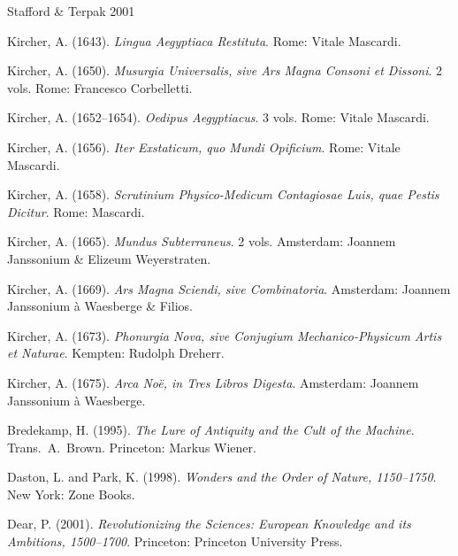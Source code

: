 \documentclass[12pt, a4paper, twoside]{memoir}
\theoremstyle{definition}
\theoremstyle{remark}
\begin{document}
\begin{thebibliography}{Stafford \& Terpak 2001}

Kircher, A. (1643). \textit{Lingua Aegyptiaca Restituta}. Rome: Vitale Mascardi.

Kircher, A. (1650). \textit{Musurgia Universalis, sive Ars Magna Consoni et Dissoni}. 2 vols. Rome: Francesco Corbelletti.

Kircher, A. (1652--1654). \textit{Oedipus Aegyptiacus}. 3 vols. Rome: Vitale Mascardi.

Kircher, A. (1656). \textit{Iter Exstaticum, quo Mundi Opificium}. Rome: Vitale Mascardi.

Kircher, A. (1658). \textit{Scrutinium Physico-Medicum Contagiosae Luis, quae Pestis Dicitur}. Rome: Mascardi.

Kircher, A. (1665). \textit{Mundus Subterraneus}. 2 vols. Amsterdam: Joannem Janssonium \& Elizeum Weyerstraten.

Kircher, A. (1669). \textit{Ars Magna Sciendi, sive Combinatoria}. Amsterdam: Joannem Janssonium \`{a} Waesberge \& Filios.

Kircher, A. (1673). \textit{Phonurgia Nova, sive Conjugium Mechanico-Physicum Artis et Naturae}. Kempten: Rudolph Dreherr.

Kircher, A. (1675). \textit{Arca No\"{e}, in Tres Libros Digesta}. Amsterdam: Joannem Janssonium \`{a} Waesberge.

\bigskip
{}\smallskip

\noindent{\color{arkgold}\rule{\linewidth}{0.4pt}}\medskip

Bredekamp, H. (1995). \textit{The Lure of Antiquity and the Cult of the Machine}. Trans.\ A.\ Brown. Princeton: Markus Wiener.

Daston, L. and Park, K. (1998). \textit{Wonders and the Order of Nature, 1150--1750}. New York: Zone Books.

Dear, P. (2001). \textit{Revolutionizing the Sciences: European Knowledge and its Ambitions, 1500--1700}. Princeton: Princeton University Press.


\end{thebibliography}
\end{document}
